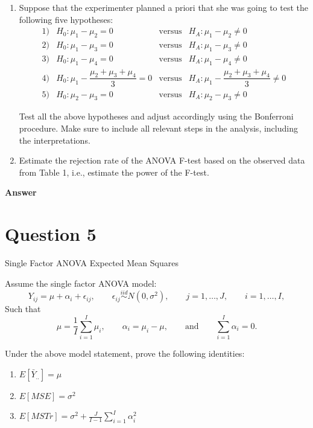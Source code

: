 \documentclass[letterpaper]{article}
\begin{document}
\begin{enumerate}
		\item[(vi)] Suppose that the experimenter planned a priori that she was going to test the following five hypotheses:
		\[
		\begin{array}{rllll}
			1) & H_0:\mu_1-\mu_2=0 & \text{versus} & H_A:\mu_1-\mu_2\neq 0 \\
			2) & H_0:\mu_1-\mu_3=0 & \text{versus} & H_A:\mu_1-\mu_3\neq 0 \\
			3) & H_0:\mu_1-\mu_4=0 & \text{versus} & H_A:\mu_1-\mu_4\neq 0 \\
			4) & H_0:\mu_1-\dfrac{\mu_2+\mu_3+\mu_4}{3}=0 & \text{versus} & H_A:\mu_1-\dfrac{\mu_2+\mu_3+\mu_4}{3}\neq 0 \\
			5) & H_0:\mu_2-\mu_3=0 & \text{versus} & H_A:\mu_2-\mu_3\neq 0
		\end{array}
		\]
		
		Test all the above hypotheses and adjust accordingly using the Bonferroni procedure. Make sure to include all relevant steps in the analysis, including the interpretations.
		
		\item[(vii)] Estimate the rejection rate of the ANOVA F-test based on the observed data from Table 1, i.e., estimate the power of the F-test.
	\end{enumerate}
	
	\textbf{Answer}
	
	\clearpage
	
	\section{Question 5}
	
	{\color{deepred}   Single Factor ANOVA Expected Mean Squares}
	
	Assume the single factor ANOVA model:
	\[
	Y_{ij}=\mu+\alpha_i+\epsilon_{ij},
	\qquad
	\epsilon_{ij}\overset{iid}{\sim}N(0,\sigma^2),
	\qquad
	j=1,\ldots,J,
	\qquad
	i=1,\ldots,I,
	\]
	Such that
	\begin{equation}
		\mu=\frac{1}{I}\sum_{i=1}^I \mu_i,
		\qquad
		\alpha_i=\mu_i-\mu,
		\qquad \text{and} \qquad
		\sum_{i=1}^I \alpha_i=0.
	\end{equation}
	
	Under the above model statement, prove the following identities:
	\begin{enumerate}
		\item[(i)]
		$
		E[\bar{Y}_{..}]=\mu
		$
		
		\item[(ii)]
		$
		E[MSE]=\sigma^2
		$
		
		\item[(iii)]
		$
		E[MSTr]=\sigma^2+\frac{J}{I-1}\sum_{i=1}^I \alpha_i^2
		$
	\end{enumerate}
	
\end{document}
